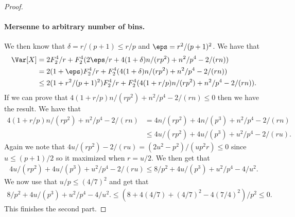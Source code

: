 \begin{proof}
    \paragraph{Mersenne to arbitrary number of bins.} We then know that
    $\delta = r/(p + 1) \le r/p$ and $\eps = r^2/(p + 1)^2$.
    We have that
    \begin{align*}
        \Var[X]
            &= 2F_2^4/r + F_2^4 (2\eps/r + 4(1 + \delta)n / (rp^2) + n^2/p^4 - 2 /(rn))
            \\&= 2(1 + \eps)F_2^4/r + F_2^4(4(1 + \delta)n / (rp^2) + n^2/p^4 - 2 / (rn))
            \\&\le 2(1 + r^2/(p + 1)^2) F_2^4/r + F_2^4(4(1 + r/p)n / (rp^2) + n^2/p^4 - 2 / (rn))
        .
    \end{align*}
    If we can prove that $4(1 + r/p)n / (rp^2) + n^2/p^4 - 2 / (rn) \le 0$ then
    we have the result. We have that
    \begin{align*}
        4(1 + r/p)n / (rp^2) + n^2/p^4 - 2 / (rn)
            &= 4 n/(rp^2) + 4 n /(p^3) + n^2/p^4 - 2/(rn)
            \\&\le 4u/(rp^2) + 4u/(p^3) + u^2/p^4 - 2/(ru) .
    \end{align*}
    Again we note that $4u/(r p^2) - 2/(ru) = (2u^2 - p^2)/(u p^2 r) \le 0$
    since $u \le (p + 1)/2$ so it maximized when $r = u/2$. We then get
    that
    \begin{align*}
       4u/(r p^2) + 4u/(p^3) + u^2/p^4 - 2/(ru)
            \le 8/p^2 + 4u/(p^3) + u^2/p^4 - 4/u^2 .
    \end{align*}
    We now use that $u/p \le (4/7)^2$ and get that
    \begin{align*}
        8/p^2 + 4u/(p^3) + u^2/p^4 - 4/u^2 .
            \le (8 + 4 (4/7) + (4/7)^2 - 4 (7/4)^2)/p^2
            \le 0 .
    \end{align*}
    This finishes the second part.
\end{proof}
